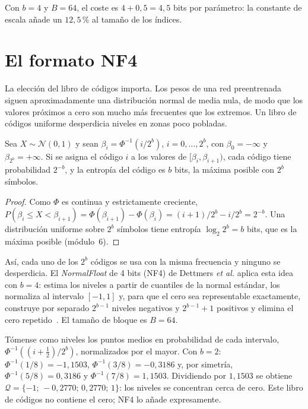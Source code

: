 Con $b=4$ y $B=64$, el coste es $4+0{,}5=4{,}5$ bits por parámetro: la constante de escala añade un $12{,}5\,\%$ al tamaño de los índices.

\section{El formato NF4}

La elección del libro de códigos importa. Los pesos de una red preentrenada siguen aproximadamente una distribución normal de media nula, de modo que los valores próximos a cero son mucho más frecuentes que los extremos. Un libro de códigos uniforme desperdicia niveles en zonas poco pobladas.

\begin{proposicion}\label{prop:cuantiles}
Sea $X\sim\mathcal{N}(0,1)$ y sean $\beta_i=\Phi^{-1}(i/2^{b})$, $i=0,\dots,2^{b}$, con $\beta_0=-\infty$ y $\beta_{2^{b}}=+\infty$. Si se asigna el código $i$ a los valores de $[\beta_i,\beta_{i+1})$, cada código tiene probabilidad $2^{-b}$, y la entropía del código es $b$ bits, la máxima posible con $2^{b}$ símbolos.
\end{proposicion}

\begin{proof}
Como $\Phi$ es continua y estrictamente creciente, $P(\beta_i\le X<\beta_{i+1})=\Phi(\beta_{i+1})-\Phi(\beta_i)=(i+1)/2^{b}-i/2^{b}=2^{-b}$. Una distribución uniforme sobre $2^{b}$ símbolos tiene entropía $\log_2 2^{b}=b$ bits, que es la máxima posible (módulo~6).
\end{proof}

Así, cada uno de los $2^{b}$ códigos se usa con la misma frecuencia y ninguno se desperdicia. El \emph{NormalFloat} de 4 bits (NF4) de Dettmers \emph{et al.} aplica esta idea con $b=4$: estima los niveles a partir de cuantiles de la normal estándar, los normaliza al intervalo $[-1,1]$ y, para que el cero sea representable exactamente, construye por separado $2^{b-1}$ niveles negativos y $2^{b-1}+1$ positivos y elimina el cero repetido~\cite[§3]{dettmers}. El tamaño de bloque es $B=64$.

\begin{ejemplo}\label{ej:cuantiles2}
Tómense como niveles los puntos medios en probabilidad de cada intervalo, $\Phi^{-1}((i+\tfrac12)/2^{b})$, normalizados por el mayor. Con $b=2$: $\Phi^{-1}(1/8)=-1{,}1503$, $\Phi^{-1}(3/8)=-0{,}3186$ y, por simetría, $\Phi^{-1}(5/8)=0{,}3186$ y $\Phi^{-1}(7/8)=1{,}1503$. Dividiendo por $1{,}1503$ se obtiene $\mathcal{Q}=\{-1;\,-0{,}2770;\,0{,}2770;\,1\}$: los niveles se concentran cerca de cero. Este libro de códigos no contiene el cero; NF4 lo añade expresamente.
\end{ejemplo}

